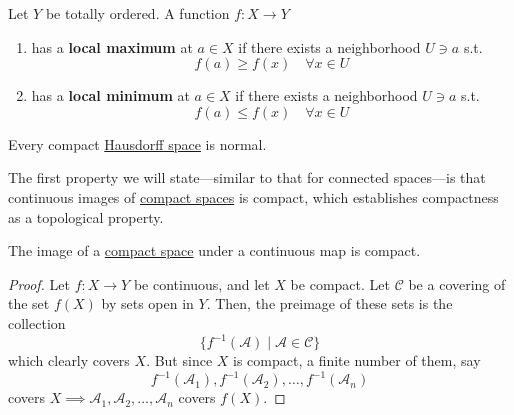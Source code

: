   \begin{definition}
		\label{def:local_extrema}
    Let $Y$ be totally ordered. A function $f: X \to Y$ 
		\begin{enumerate}
			\item has a \textbf{local maximum} at $a \in X$ if there exists a neighborhood $U \ni a$ s.t. 
				\begin{equation}
					f(a) \geq f(x) \quad \forall x \in U
				\end{equation}
			\item has a \textbf{local minimum} at $a \in X$ if there exists a neighborhood $U \ni a$ s.t. 
				\begin{equation}
					f(a) \leq f(x) \quad \forall x \in U
				\end{equation}
		\end{enumerate}
  \end{definition}

  \begin{theorem}
    \label{thm:compact-hausdorff-spaces-are-normal}
    Every compact \hyperref[def:hausdorff-space]{Hausdorff space} is normal. 
  \end{theorem}


  The first property we will state---similar to that for connected spaces---is that continuous images of \hyperref[def:compact-space]{compact spaces} is compact, which establishes compactness as a topological property. 

  \begin{theorem}
    \label{thm:continuous-images-of-compact-sets-are-compact}
    The image of a \hyperref[def:compact-space]{compact space} under a continuous map is compact.
  \end{theorem}
  \begin{proof}
    Let $f: X \rightarrow Y$ be continuous, and let $X$ be compact. Let $\mathcal{C}$ be a covering of the set $f(X)$ by sets open in $Y$. Then, the preimage of these sets is the collection
    \begin{equation}
      \{f^{-1}(\mathcal{A}) \; | \; \mathcal{A} \in \mathcal{C}\}
    \end{equation}
    which clearly covers $X$. But since $X$ is compact, a finite number of them, say
    \begin{equation}
      f^{-1} (\mathcal{A}_1), f^{-1} (\mathcal{A}_2), \ldots , f^{-1} (\mathcal{A}_n)
    \end{equation}
    covers $X \implies \mathcal{A}_1, \mathcal{A}_2, \ldots, \mathcal{A}_n$ covers $f(X)$. 
  \end{proof}

